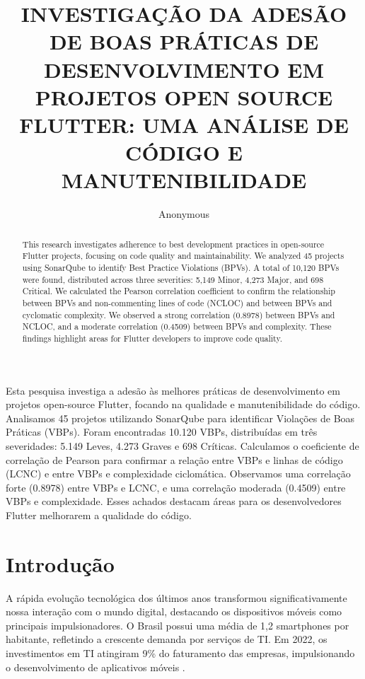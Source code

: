 \documentclass[12pt]{article}
\title{INVESTIGAÇÃO DA ADESÃO DE BOAS PRÁTICAS DE DESENVOLVIMENTO EM PROJETOS OPEN SOURCE FLUTTER: UMA ANÁLISE DE CÓDIGO E MANUTENIBILIDADE}
\author{Anonymous\inst{1}}
\begin{document}
 

\maketitle

\begin{abstract}
This research investigates adherence to best development practices in open-source Flutter projects, focusing on code quality and maintainability. We analyzed 45 projects using SonarQube to identify Best Practice Violations (BPVs). A total of 10,120 BPVs were found, distributed across three severities: 5,149 Minor, 4,273 Major, and 698 Critical. We calculated the Pearson correlation coefficient to confirm the relationship between BPVs and non-commenting lines of code (NCLOC) and between BPVs and cyclomatic complexity. We observed a strong correlation (0.8978) between BPVs and NCLOC, and a moderate correlation (0.4509) between BPVs and complexity. These findings highlight areas for Flutter developers to improve code quality.
\end{abstract}
     
\begin{resumo} 
Esta pesquisa investiga a adesão às melhores práticas de desenvolvimento em projetos open-source Flutter, focando na qualidade e manutenibilidade do código. Analisamos 45 projetos utilizando SonarQube para identificar Violações de Boas Práticas (VBPs). Foram encontradas 10.120 VBPs, distribuídas em três severidades: 5.149 Leves, 4.273 Graves e 698 Críticas. Calculamos o coeficiente de correlação de Pearson para confirmar a relação entre VBPs e linhas de código (LCNC) e entre VBPs e complexidade ciclomática. Observamos uma correlação forte (0.8978) entre VBPs e LCNC, e uma correlação moderada (0.4509) entre VBPs e complexidade. Esses achados destacam áreas para os desenvolvedores Flutter melhorarem a qualidade do código.
\end{resumo}

\section{Introdução}
A rápida evolução tecnológica dos últimos anos transformou significativamente nossa interação com o mundo digital, destacando os dispositivos móveis como principais impulsionadores. O Brasil possui uma média de 1,2 smartphones por habitante, refletindo a crescente demanda por serviços de TI. Em 2022, os investimentos em TI atingiram 9\% do faturamento das empresas, impulsionando o desenvolvimento de aplicativos móveis \cite{FGVcia2023}.
\end{document}
